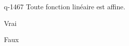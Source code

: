 \begin{truefalse}{q-1467}
Toute fonction linéaire est affine.
\item* Vrai
\item Faux
\end{truefalse}

